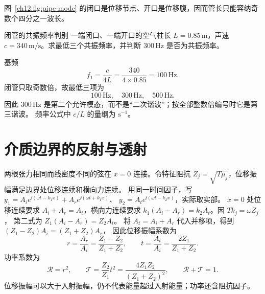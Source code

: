 \begin{center}
\label{ch12:fig:pipe-mode}
\end{center}
图~\ref{ch12:fig:pipe-mode} 的闭口是位移节点、开口是位移腹，因而管长只能容纳奇数个四分之一波长。

\begin{origexamplebox}{闭管的共振频率判别}
\label{ch12:ex:07}
一端闭口、一端开口的空气柱长 $L=0.85\,\mathrm m$，声速 $c=340\,\mathrm{m/s}$。求最低三个共振频率，并判断 $300\,\mathrm{Hz}$ 是否为共振频率。
\end{origexamplebox}
\begin{xesolution}
基频
\[
 f_1=\frac c{4L}=\frac{340}{4\times0.85}=100\,\mathrm{Hz}.
\]
闭管只取奇数倍，故最低三项为
\[
 \boxed{100\,\mathrm{Hz},\quad300\,\mathrm{Hz},\quad500\,\mathrm{Hz}}.
\]
因此 $300\,\mathrm{Hz}$ 是第二个允许模态，而不是“二次谐波”；按全部整数倍编号时它是第三谐波。
频率公式中 $c/L$ 的量纲为 $\mathrm{s^{-1}}$。
\end{xesolution}


\section{介质边界的反射与透射}

两根张力相同而线密度不同的弦在 $x=0$ 连接。令特征阻抗 $Z_j=\sqrt{T\mu_j}$，位移振幅满足边界处位移连续和横向力连续。
用同一时间因子，写
$y_1=A_i e^{\ii(\omega t-k_1x)}+A_r e^{\ii(\omega t+k_1x)}$、
$y_2=A_t e^{\ii(\omega t-k_2x)}$，实际取实部。
$x=0$ 处位移连续要求 $A_i+A_r=A_t$，横向力连续要求
$k_1(A_i-A_r)=k_2A_t$。因 $Tk_j=\omega Z_j$，
第二式为 $Z_1(A_i-A_r)=Z_2A_t$。
将 $A_t=A_i+A_r$ 代入并移项，得到 $(Z_1-Z_2)A_i=(Z_1+Z_2)A_r$，
因此位移振幅系数为
\begin{equation}
 r=\frac{A_r}{A_i}=\frac{Z_1-Z_2}{Z_1+Z_2},
 \qquad
 t=\frac{A_t}{A_i}=\frac{2Z_1}{Z_1+Z_2}.
\end{equation}
功率系数为
\begin{equation}
 \mathcal R=r^2,
 \qquad
 \mathcal T=\frac{Z_2}{Z_1}t^2
 =\frac{4Z_1Z_2}{(Z_1+Z_2)^2},
 \qquad \mathcal R+\mathcal T=1.
\end{equation}
位移振幅可以大于入射振幅，仍不代表能量超过入射能量；功率还含阻抗因子。

